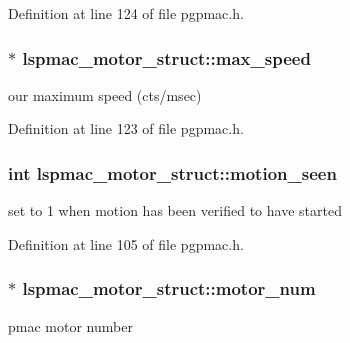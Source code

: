 Definition at line 124 of file pgpmac.\-h.

\hypertarget{structlspmac__motor__struct_a69e49769a1001665377efc7193d88a0a}{
\subsubsection[{max\-\_\-speed}]{$\ast$ lspmac\-\_\-motor\-\_\-struct\-::max\-\_\-speed}}\label{structlspmac__motor__struct_a69e49769a1001665377efc7193d88a0a}


our maximum speed (cts/msec) 



Definition at line 123 of file pgpmac.\-h.

\hypertarget{structlspmac__motor__struct_a68c471836f52707fa8582f7860cf500f}{
\subsubsection[{motion\-\_\-seen}]{\setlength{\rightskip}{0pt plus 5cm}int lspmac\-\_\-motor\-\_\-struct\-::motion\-\_\-seen}}\label{structlspmac__motor__struct_a68c471836f52707fa8582f7860cf500f}


set to 1 when motion has been verified to have started 



Definition at line 105 of file pgpmac.\-h.

\hypertarget{structlspmac__motor__struct_ad6a51cca3c7e5f79168e5c33fd9e736b}{
\subsubsection[{motor\-\_\-num}]{$\ast$ lspmac\-\_\-motor\-\_\-struct\-::motor\-\_\-num}}\label{structlspmac__motor__struct_ad6a51cca3c7e5f79168e5c33fd9e736b}


pmac motor number 



